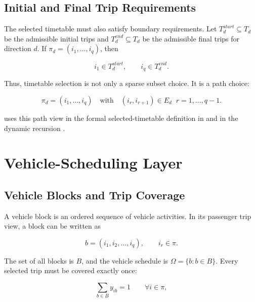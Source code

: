 \subsection{Initial and Final Trip Requirements}

The selected timetable must also satisfy boundary requirements. Let
\(T_d^{start}\subseteq T_d\) be the admissible initial trips and
\(T_d^{end}\subseteq T_d\) be the admissible final trips for direction \(d\).
If \(\pi_d=(i_1,\ldots,i_q)\), then

\begin{equation}
i_1\in T_d^{start},
\qquad
i_q\in T_d^{end}.
\label{eq:boundary-trips}
\end{equation}

Thus, timetable selection is not only a sparse subset choice. It is a path
choice:

\begin{equation}
\pi_d=(i_1,\ldots,i_q)
\quad\text{with}\quad
(i_r,i_{r+1})\in E_d
\;\; r=1,\ldots,q-1.
\label{eq:timetable-path-definition}
\end{equation}

 uses this path view in the formal selected-timetable
definition in  and in the dynamic recursion
.

\section{Vehicle-Scheduling Layer}

\subsection{Vehicle Blocks and Trip Coverage}

A vehicle block is an ordered sequence of vehicle activities. In its passenger
trip view, a block can be written as

\begin{equation}
b=(i_1,i_2,\ldots,i_q),
\qquad i_r\in\pi.
\label{eq:block-trip-sequence}
\end{equation}

The set of all blocks is \(B\), and the vehicle schedule is
\(\Omega=\{b:b\in B\}\). Every selected trip must be covered exactly once:

\begin{equation}
\sum_{b\in B} y_{ib}=1
\qquad
\forall i\in\pi,
\label{eq:problem-trip-coverage}
\end{equation}

